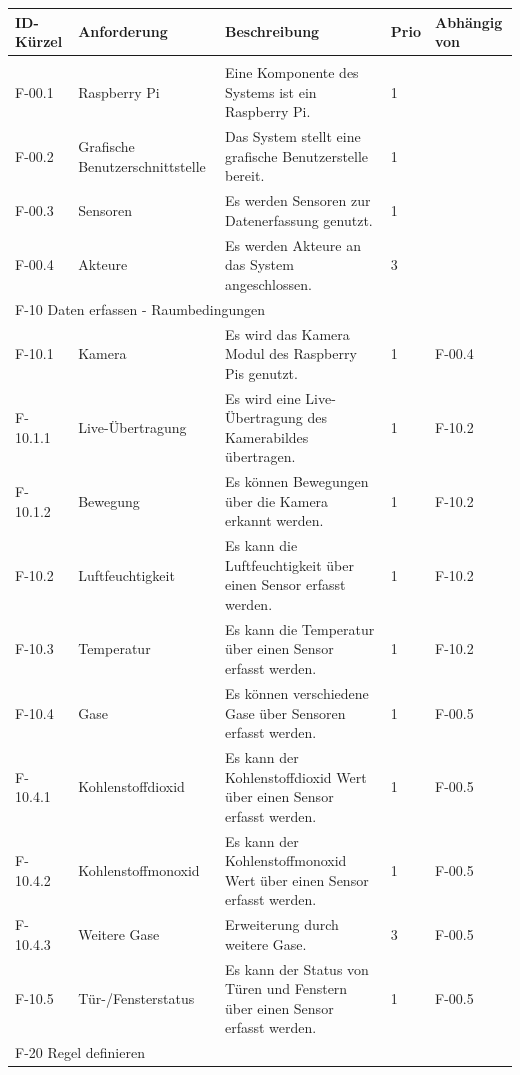 \begin{tabularx}{\textwidth}{|l|X|X|l|l|}
    \toprule
    \textbf{ID-Kürzel} & \textbf{Anforderung} & \textbf{Beschreibung} & \textbf{Prio} & \textbf{Abhängig von} \\
    \hline
    \endhead
    \hline
    \caption{Anforderungen}
    \endfoot
    \multicolumn{5}{|l|}{F-00 Allgemein}\\
    \hline
    F-00.1 & Raspberry Pi & Eine Komponente des Systems ist ein Raspberry Pi. & 1 & \\
    F-00.2 &Grafische Benutzerschnittstelle & Das System stellt eine grafische Benutzerstelle bereit. & 1 & \\
    F-00.3 & Sensoren & Es werden Sensoren zur Datenerfassung genutzt. & 1 & \\
    F-00.4 & Akteure & Es werden Akteure an das System angeschlossen. & 3 & \\
    \hline
    \multicolumn{5}{|l|}{F-10 Daten erfassen - Raumbedingungen}\\
    \hline
    F-10.1   & Kamera & Es wird das Kamera Modul des Raspberry Pis genutzt. & 1 & F-00.4\\
    F-10.1.1 & Live-Übertragung & Es wird eine Live-Übertragung des Kamerabildes übertragen. & 1 & F-10.2 \\
    F-10.1.2 & Bewegung & Es können Bewegungen über die Kamera erkannt werden. & 1 & F-10.2 \\
    F-10.2 & Luftfeuchtigkeit & Es kann die Luftfeuchtigkeit über einen Sensor erfasst werden. & 1 & F-10.2 \\
    F-10.3 & Temperatur & Es kann die Temperatur über einen Sensor erfasst werden. & 1 & F-10.2 \\
    F-10.4 & Gase & Es können verschiedene Gase über Sensoren erfasst werden.  & 1 & F-00.5\\
    F-10.4.1 & Kohlenstoffdioxid & Es kann der Kohlenstoffdioxid Wert über einen Sensor erfasst werden. & 1 & F-00.5\\
    F-10.4.2 & Kohlenstoffmonoxid & Es kann der Kohlenstoffmonoxid Wert über einen Sensor erfasst werden. & 1 & F-00.5\\
    F-10.4.3 & Weitere Gase & Erweiterung durch weitere Gase. & 3 & F-00.5\\
    F-10.5 & Tür-/Fensterstatus & Es kann der Status von Türen und Fenstern über einen Sensor erfasst werden.  & 1 & F-00.5\\
    \hline
    \multicolumn{5}{|l|}{F-20 Regel definieren}\\

\end{tabularx}
